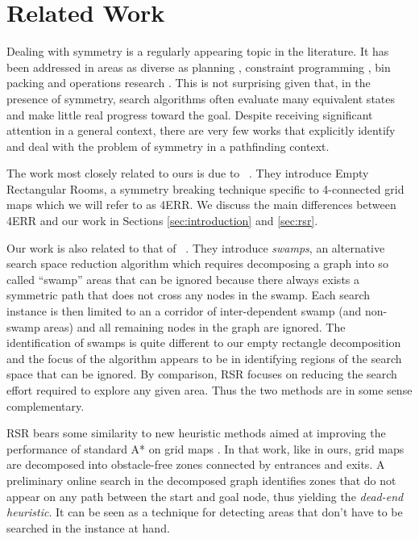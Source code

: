 \section{Related Work}
\label{sec:relatedwork}
Dealing with symmetry is a regularly appearing topic in the literature.  It has
been addressed in areas as diverse as planning \cite{}, constraint programming
\cite{}, bin packing \cite{} and operations research \cite{}.  This is not
surprising given that, in the presence of symmetry, search algorithms often
evaluate many equivalent states and make little real progress toward the goal.
Despite receiving significant attention in a general context, there are very few
works that explicitly identify and deal with the problem of symmetry in a
pathfinding context.
\par
The work most closely related to ours is due to
\citeauthor{harabor10}~.  They introduce Empty Rectangular
Rooms, a symmetry breaking technique specific to 4-connected grid maps which we
will refer to as 4ERR.  We discuss the main differences between 4ERR and our
work in Sections \ref{sec:introduction} and \ref{sec:rsr}.
\par
Our work is also related to that of
\citeauthor{pochter10}~.  They introduce \emph{swamps}, an
alternative search space reduction algorithm which requires decomposing a graph
into so called ``swamp'' areas that can be ignored because there always exists a
symmetric path that does not cross any nodes in the swamp.  Each search instance
is then limited to an a corridor of inter-dependent swamp (and non-swamp areas)
and all remaining nodes in the graph are ignored.  The identification of swamps
is quite different to our empty rectangle decomposition and the focus of the
algorithm appears to be in identifying regions of the search space that can be
ignored.  By comparison, RSR focuses on reducing the search effort required to
explore any given area.
Thus the two methods are in some sense complementary.
\par
RSR bears some similarity to new heuristic methods aimed at improving the
performance of standard A* on grid maps \cite{bjornsson06}.  In that work, like
in ours, grid maps are decomposed into obstacle-free zones connected by
entrances and exits.  A preliminary online search in the decomposed graph
identifies zones that do not appear on any path between the start and goal node,
thus yielding the \emph{dead-end heuristic}.  It can be seen as a technique for
detecting areas that don't have to be searched in the instance at hand.

